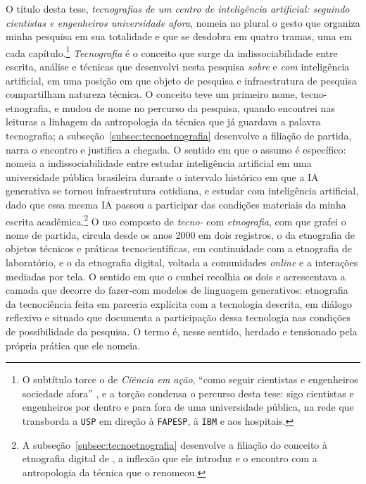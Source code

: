 O título desta tese, \textit{tecnografias de um centro de inteligência artificial: seguindo cientistas e engenheiros universidade afora}, nomeia no plural o gesto que organiza minha pesquisa em sua totalidade e que se desdobra em quatro tramas, uma em cada capítulo.\footnote{O subtítulo torce o de \textit{Ciência em ação}, \enquote{como seguir cientistas e engenheiros sociedade afora} \parencite{Latour2011CienciaEmAcao}, e a torção condensa o percurso desta tese: sigo cientistas e engenheiros por dentro e para fora de uma universidade pública, na rede que transborda a \texttt{USP} em direção à \texttt{FAPESP}, à \texttt{IBM} e aos hospitais.} \textit{Tecnografia} é o conceito que surge da indissociabilidade entre escrita, análise e técnicas que desenvolvi nesta pesquisa \textit{sobre} e \textit{com} inteligência artificial, em uma posição em que objeto de pesquisa e infraestrutura de pesquisa compartilham natureza técnica. O conceito teve um primeiro nome, tecno-etnografia, e mudou de nome no percurso da pesquisa, quando encontrei nas leituras a linhagem da antropologia da técnica que já guardava a palavra tecnografia; a subseção~\ref{subsec:tecnoetnografia} desenvolve a filiação de partida, narra o encontro e justifica a chegada. O sentido em que o assumo é específico: nomeia a indissociabilidade entre estudar inteligência artificial em uma universidade pública brasileira durante o intervalo histórico em que a IA generativa se tornou infraestrutura cotidiana, e estudar com inteligência artificial, dado que essa mesma IA passou a participar das condições materiais da minha escrita acadêmica.\footnote{A subseção~\ref{subsec:tecnoetnografia} desenvolve a filiação do conceito à etnografia digital de \textcite{Pink2016DigitalEthnography}, a inflexão que ele introduz e o encontro com a antropologia da técnica que o renomeou.} O uso composto de \textit{tecno-} com \textit{etnografia}, com que grafei o nome de partida, circula desde os anos 2000 em dois registros, o da etnografia de objetos técnicos e práticas tecnocientíficas, em continuidade com a etnografia de laboratório, e o da etnografia digital, voltada a comunidades \emph{online} e a interações mediadas por tela. O sentido em que o cunhei recolhia os dois e acrescentava a camada que decorre do fazer-com modelos de linguagem generativos: etnografia da tecnociência feita em parceria explícita com a tecnologia descrita, em diálogo reflexivo e situado que documenta a participação dessa tecnologia nas condições de possibilidade da pesquisa. O termo é, nesse sentido, herdado e tensionado pela própria prática que ele nomeia.

